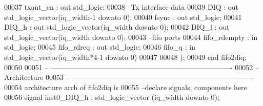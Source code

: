 \begin{DoxyCode}
00037       \textcolor{vhdlchar}{txant_en}             \textcolor{vhdlchar}{:} \textcolor{keywordflow}{out} \textcolor{comment}{std\_logic};                 
00038 \textcolor{keyword}{      --Tx interface data }
00039       \textcolor{vhdlchar}{DIQ}                  \textcolor{vhdlchar}{:} \textcolor{keywordflow}{out} \textcolor{comment}{std\_logic\_vector}\textcolor{vhdlchar}{(}\textcolor{vhdlchar}{iq_width}\textcolor{vhdlchar}{-}\textcolor{vhdllogic}{}\textcolor{vhdllogic}{1} \textcolor{keywordflow}{downto} \textcolor{vhdllogic}{}\textcolor{vhdllogic}{0}\textcolor{vhdlchar}{)};
00040       \textcolor{vhdlchar}{fsync}                \textcolor{vhdlchar}{:} \textcolor{keywordflow}{out} \textcolor{comment}{std\_logic};
00041       \textcolor{vhdlchar}{DIQ_h}                \textcolor{vhdlchar}{:} \textcolor{keywordflow}{out} \textcolor{comment}{std\_logic\_vector}\textcolor{vhdlchar}{(}\textcolor{vhdlchar}{iq_width} \textcolor{keywordflow}{downto} \textcolor{vhdllogic}{}\textcolor{vhdllogic}{0}\textcolor{vhdlchar}{)};
00042       \textcolor{vhdlchar}{DIQ_l}                \textcolor{vhdlchar}{:} \textcolor{keywordflow}{out} \textcolor{comment}{std\_logic\_vector}\textcolor{vhdlchar}{(}\textcolor{vhdlchar}{iq_width} \textcolor{keywordflow}{downto} \textcolor{vhdllogic}{}\textcolor{vhdllogic}{0}\textcolor{vhdlchar}{)};
00043 \textcolor{keyword}{      --fifo ports }
00044       \textcolor{vhdlchar}{fifo_rdempty}         \textcolor{vhdlchar}{:} \textcolor{keywordflow}{in} \textcolor{comment}{std\_logic};
00045       \textcolor{vhdlchar}{fifo_rdreq}           \textcolor{vhdlchar}{:} \textcolor{keywordflow}{out} \textcolor{comment}{std\_logic};
00046       \textcolor{vhdlchar}{fifo_q}               \textcolor{vhdlchar}{:} \textcolor{keywordflow}{in} \textcolor{comment}{std\_logic\_vector}\textcolor{vhdlchar}{(}\textcolor{vhdlchar}{iq_width}\textcolor{vhdlchar}{*}\textcolor{vhdllogic}{4-1} \textcolor{keywordflow}{downto} \textcolor{vhdllogic}{}\textcolor{vhdllogic}{0}\textcolor{vhdlchar}{)} 
00047 
00048         \textcolor{vhdlchar}{)};
00049 \textcolor{keywordflow}{end} \textcolor{vhdlchar}{fifo2diq};
00050 
00051 \textcolor{keyword}{-- ----------------------------------------------------------------------------}
00052 \textcolor{keyword}{-- Architecture}
00053 \textcolor{keyword}{-- ----------------------------------------------------------------------------}
00054 \textcolor{keywordflow}{architecture} arch \textcolor{keywordflow}{of} fifo2diq is
00055 \textcolor{keyword}{--declare signals,  components here}
00056 \textcolor{keywordflow}{signal} \textcolor{vhdlchar}{inst0_DIQ_h}         \textcolor{vhdlchar}{:} \textcolor{comment}{std\_logic\_vector} \textcolor{vhdlchar}{(}\textcolor{vhdlchar}{iq_width} \textcolor{keywordflow}{downto} \textcolor{vhdllogic}{}\textcolor{vhdllogic}{0}\textcolor{vhdlchar}{)}; 

\end{DoxyCode}
